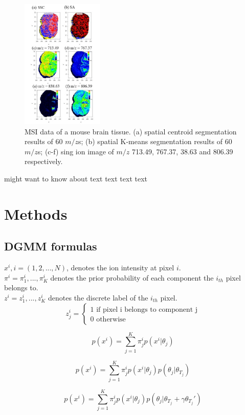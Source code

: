 \documentclass{bioinfo}
\begin{document}
\begin{figure}[b!]
    \centering
	\includegraphics[width=0.35\textwidth]{figure2.jpg}
    \caption{MSI data of a mouse brain tissue. (a) spatial centroid segmentation results of 60 $m/z$s; (b) spatial K-means segmentation results of 60 $m/z$s; (c-f) sing ion image of $m/z$ 713.49, 767.37, 38.63 and 806.39 respectively.}
    \label{fig:figure2}
\end{figure}
\citealp{Boffelli03} might want to know about text text text
text\vspace*{1pt}


\section{Methods}
\subsection{DGMM formulas}
$x^i, i = (1,2,...,N)$, denotes the ion intensity at pixel $i$.\\
$\pi^i={\pi^i_1,..., \pi^i_K}$ denotes the prior probability of each component the $i_{th}$ pixel belongs to.\\
$z^i={z^i_1,...,z^i_K}$ denotes the discrete label of the $i_{th}$ pixel.\\
$$z^i_j=\left\{\begin{matrix}
1 \textrm{ if pixel i belongs to component j}\\ 
0 \textrm{ otherwise} 

\end{matrix}\right.$$

$$p(x^i)=\sum_{j=1}^{K}\pi^i_jp(x^i|\theta_j)$$

$$p(x^i)=\sum_{j=1}^{K}\pi^i_jp(x^i|\theta_j)p(\theta_j|\theta_{T_j})$$

$$p(x^i)=\sum_{j=1}^{K}\pi^i_jp(x^i|\theta_j)p(\theta_j|\theta_{T_j}+\gamma \theta_{T_j}')$$
\end{document}
